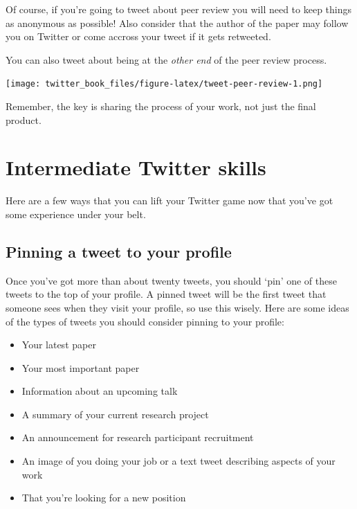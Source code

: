 \documentclass[
]{book}
\providecommand{\tightlist}{%
  \setlength{\itemsep}{0pt}\setlength{\parskip}{0pt}}
\begin{document}
Of course, if you're going to tweet about peer review you will need to keep things as anonymous as possible! Also consider that the author of the paper may follow you on Twitter or come accross your tweet if it gets retweeted.

You can also tweet about being at the \emph{other end} of the peer review process.

\texttt{[image: twitter\_book\_files/figure-latex/tweet-peer-review-1.png]}

Remember, the key is sharing the process of your work, not just the final product.

\hypertarget{intermediate}{%
\chapter{Intermediate Twitter skills}\label{intermediate}}

Here are a few ways that you can lift your Twitter game now that you've got some experience under your belt.

\hypertarget{pinning-a-tweet-to-your-profile}{%
\section*{Pinning a tweet to your profile}\label{pinning-a-tweet-to-your-profile}}

Once you've got more than about twenty tweets, you should `pin' one of these tweets to the top of your profile. A pinned tweet will be the first tweet that someone sees when they visit your profile, so use this wisely. Here are some ideas of the types of tweets you should consider pinning to your profile:

\begin{itemize}
\tightlist
\item
  Your latest paper
\item
  Your most important paper
\item
  Information about an upcoming talk
\item
  A summary of your current research project
\item
  An announcement for research participant recruitment
\item
  An image of you doing your job or a text tweet describing aspects of your work
\item
  That you're looking for a new position
\end{itemize}
\end{document}
